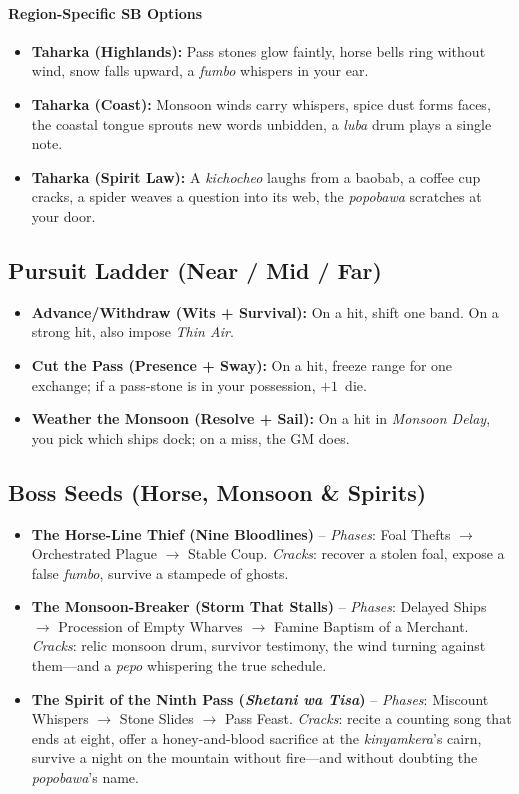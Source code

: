 \paragraph{Region-Specific SB Options}
\begin{itemize}
\item \textbf{Taharka (Highlands):} Pass stones glow faintly, horse bells ring without wind, snow falls upward, a \textit{fumbo} whispers in your ear.
\item \textbf{Taharka (Coast):} Monsoon winds carry whispers, spice dust forms faces, the coastal tongue sprouts new words unbidden, a \textit{luba} drum plays a single note.
\item \textbf{Taharka (Spirit Law):} A \textit{kichocheo} laughs from a baobab, a coffee cup cracks, a spider weaves a question into its web, the \textit{popobawa} scratches at your door.
\end{itemize}

\subsection{Pursuit Ladder (Near / Mid / Far)}
\begin{itemize}
\item \textbf{Advance/Withdraw (Wits + Survival):} On a hit, shift one band. On a strong hit, also impose \emph{Thin Air}.
\item \textbf{Cut the Pass (Presence + Sway):} On a hit, freeze range for one exchange; if a pass-stone is in your possession, $+1$~die.
\item \textbf{Weather the Monsoon (Resolve + Sail):} On a hit in \emph{Monsoon Delay}, you pick which ships dock; on a miss, the GM does.
\end{itemize}

\subsection{Boss Seeds (Horse, Monsoon \& Spirits)}
\begin{itemize}
\item \textbf{The Horse-Line Thief (Nine Bloodlines)} -- \textit{Phases}: Foal Thefts $\rightarrow$ Orchestrated Plague $\rightarrow$ Stable Coup. \textit{Cracks}: recover a stolen foal, expose a false \textit{fumbo}, survive a stampede of ghosts.
\item \textbf{The Monsoon-Breaker (Storm That Stalls)} -- \textit{Phases}: Delayed Ships $\rightarrow$ Procession of Empty Wharves $\rightarrow$ Famine Baptism of a Merchant. \textit{Cracks}: relic monsoon drum, survivor testimony, the wind turning against them---and a \textit{pepo} whispering the true schedule.
\item \textbf{The Spirit of the Ninth Pass (\textit{Shetani wa Tisa})} -- \textit{Phases}: Miscount Whispers $\rightarrow$ Stone Slides $\rightarrow$ Pass Feast. \textit{Cracks}: recite a counting song that ends at eight, offer a honey-and-blood sacrifice at the \textit{kinyamkera}'s cairn, survive a night on the mountain without fire---and without doubting the \textit{popobawa}'s name.
\end{itemize}

